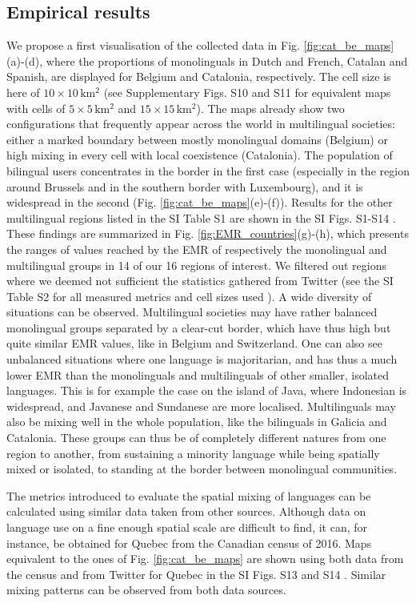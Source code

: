 \documentclass[../thesis.tex]{subfiles}
\begin{document}
\subsection{Empirical results}
We propose a first visualisation of the collected data in Fig.
\ref{fig:cat_be_maps}(a)-(d), where the proportions of
monolinguals in Dutch and French, Catalan and Spanish, are displayed for Belgium and
Catalonia, respectively. The cell size is here of $10 \times 10 \, \si{\kilo \meter
\squared}$ (see Supplementary Figs. S10 and S11 \cite{supp} for equivalent maps with
cells of $5 \times 5 \, \si{\kilo \meter \squared}$ and $15 \times 15 \, \si{\kilo
\meter \squared}$). The maps already show two configurations that frequently appear
across the world in multilingual societies: either a marked boundary between mostly
monolingual domains (Belgium) or high mixing in every cell with local coexistence
(Catalonia). The population of bilingual users concentrates in the border in the first
case (especially in the region around Brussels and in the southern border with
Luxembourg), and it is widespread in the second (Fig.
\ref{fig:cat_be_maps}(e)-(f)). Results for the other
multilingual regions listed in the SI Table S1 are shown in the SI Figs. S1-S14
\cite{supp}. These findings are summarized in Fig.
\ref{fig:EMR_countries}(g)-(h), which presents the ranges of
values reached by the \ac{EMR} of respectively the monolingual and multilingual groups in 14
of our 16 regions of interest. We filtered out regions where we deemed not sufficient
the statistics gathered from Twitter (see the SI Table S2 for all measured metrics and
cell sizes used \cite{supp}). A wide diversity of situations can be observed.
Multilingual societies may have rather balanced monolingual groups separated by a
clear-cut border, which have thus high but quite similar \ac{EMR} values, like in Belgium and
Switzerland. One can also see unbalanced situations where one language is majoritarian,
and has thus a much lower \ac{EMR} than the monolinguals and multilinguals of other smaller,
isolated languages. This is for example the case on the island of Java, where Indonesian
is widespread, and Javanese and Sundanese are more localised. Multilinguals may also be
mixing well in the whole population, like the bilinguals in Galicia and Catalonia. These
groups can thus be of completely different natures from one region to another, from
sustaining a minority language while being spatially mixed or isolated, to standing at
the border between monolingual communities.

The metrics introduced to evaluate the spatial mixing of languages can be calculated
using similar data taken from other sources. Although data on language use on a fine
enough spatial scale are difficult to find, it can, for instance, be obtained for Quebec
from the Canadian census of 2016. Maps equivalent to the ones of Fig.
\ref{fig:cat_be_maps} are shown using both data from the census and from
Twitter for Quebec in the SI Figs. S13 and S14 \cite{supp}. Similar mixing patterns can
be observed from both data sources.
\end{document}
